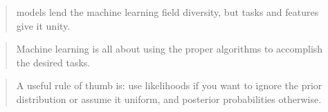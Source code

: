 \documentclass[11pt,letterpaper,oneside]{memoir}
\theoremstyle{definition}
\newcommand{\eg}{\textit{e}.\textit{g}. }
\begin{document}

\begin{quote}
  models lend the machine learning field diversity, but tasks and features give
  it unity. \cite[p. 13]{Flach2012}
\end{quote}

\begin{quote}
  Machine learning is all about using the proper algorithms to accomplish the
  desired \glspl{task}.
\end{quote}

\begin{quote}
  A useful rule of thumb is: use likelihoods if you want to ignore the prior
  distribution or assume it uniform, and posterior probabilities otherwise.
  \cite[p. 28]{Flach2012} 
\end{quote}
\end{document}
